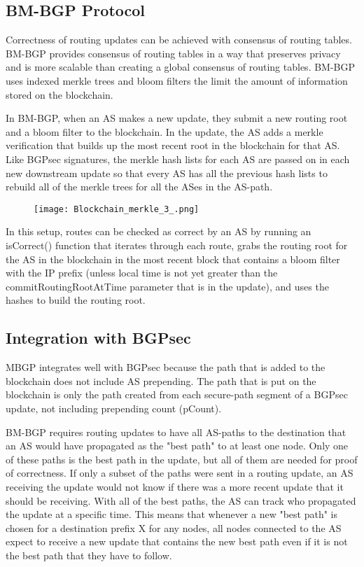 \documentclass[letterpaper, 10 pt, conference]{ieeeconf}  %
\begin{document}
\subsection{BM-BGP Protocol}

Correctness of routing updates can be achieved with consensus of routing tables. BM-BGP provides consensus of routing tables in a way that preserves privacy and is more scalable than creating a global consensus of routing tables. BM-BGP uses indexed merkle trees and bloom filters the limit the amount of information stored on the blockchain. 

In BM-BGP, when an AS makes a new update, they submit a new routing root and a bloom filter to the blockchain. In the update, the AS adds a merkle verification that builds up the most recent root in the blockchain for that AS. Like BGPsec signatures, the merkle hash lists for each AS are passed on in each new downstream update so that every AS has all the previous hash lists to rebuild all of the merkle trees for all the ASes in the AS-path.

\begin{figure}[!ht]
	\centering
	\texttt{[image: Blockchain\_merkle\_3\_.png]}
    \end{figure}
 
In this setup, routes can be checked as correct by an AS by running an isCorrect() function that iterates through each route, grabs the routing root for the AS in the blockchain in the most recent block that contains a bloom filter with the IP prefix (unless local time is not yet greater than the commitRoutingRootAtTime parameter that is in the update), and uses the hashes to build the routing root. 

\subsection{Integration with BGPsec}
MBGP integrates well with BGPsec because the path that is added to the blockchain does not include AS prepending. The path that is put on the blockchain is only the path created from each secure-path segment of a BGPsec update, not including prepending count (pCount). 

BM-BGP requires routing updates to have all AS-paths to the destination that an AS would have propagated as the "best path" to at least one node. Only one of these paths is the best path in the update, but all of them are needed for proof of correctness. If only a subset of the paths were sent in a routing update, an AS receiving the update would not know if there was a more recent update that it should be receiving. With all of the best paths, the AS can track who propagated the update at a specific time. This means that whenever a new "best path" is chosen for a destination prefix X for any nodes, all nodes connected to the AS expect to receive a new update that contains the new best path even if it is not the best path that they have to follow. 
\end{document}
